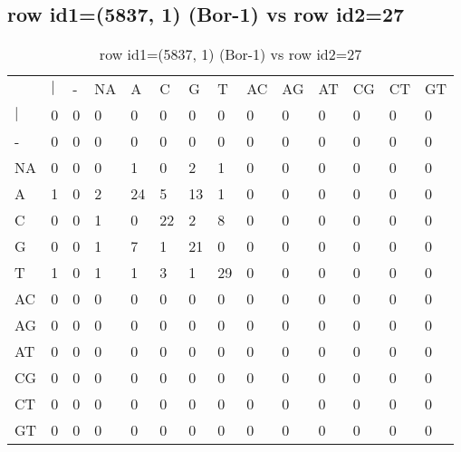 \subsection{row id1=(5837, 1) (Bor-1) vs row id2=27}
\begin{center}
\begin{longtable}{|l|l|l|l|l|l|l|l|l|l|l|l|l|l|}
\caption{row id1=(5837, 1) (Bor-1) vs row id2=27} \label{table_dm2}\\
\hline
\\
\hline
&$|$&-&NA&A&C&G&T&AC&AG&AT&CG&CT&GT\\
$|$&0&0&0&0&0&0&0&0&0&0&0&0&0\\
-&0&0&0&0&0&0&0&0&0&0&0&0&0\\
NA&0&0&0&1&0&2&1&0&0&0&0&0&0\\
A&1&0&2&24&5&13&1&0&0&0&0&0&0\\
C&0&0&1&0&22&2&8&0&0&0&0&0&0\\
G&0&0&1&7&1&21&0&0&0&0&0&0&0\\
T&1&0&1&1&3&1&29&0&0&0&0&0&0\\
AC&0&0&0&0&0&0&0&0&0&0&0&0&0\\
AG&0&0&0&0&0&0&0&0&0&0&0&0&0\\
AT&0&0&0&0&0&0&0&0&0&0&0&0&0\\
CG&0&0&0&0&0&0&0&0&0&0&0&0&0\\
CT&0&0&0&0&0&0&0&0&0&0&0&0&0\\
GT&0&0&0&0&0&0&0&0&0&0&0&0&0\\
\hline
\end{longtable}
\end{center}

